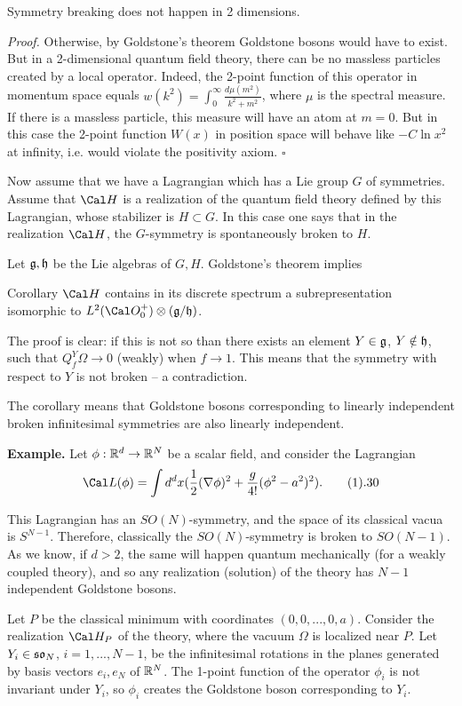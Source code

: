 Symmetry breaking does not happen in 2 dimensions. 
\endproclaim

{\it Proof.} Otherwise, by Goldstone's theorem 
Goldstone bosons would have to exist. But in a 2-dimensional 
quantum field theory, there can be no massless particles
created by a local operator. Indeed, 
the 2-point function of this operator in momentum space 
equals $w(k^2)=\int_0^\infty\frac{d\mu(m^2)}{k^2+m^2}$, where 
$\mu$ is the spectral measure. If there is a massless particle, 
this measure will have an atom at $m=0$. But in this case
the 2-point function $W(x)$ in position space will behave 
like $-C\ln x^2$ at infinity, i.e. would
violate the positivity axiom. $\square$

Now assume that we have a Lagrangian which has a Lie group $G$ 
of symmetries. Assume that $\Cal H$ is a 
realization of the quantum field theory defined 
by this Lagrangian, whose stabilizer is $H\subset G$. In this case 
one says that in the realization $\Cal H$, the $G$-symmetry is spontaneously 
broken to $H$. 

Let $\frak g,\frak h$ be the Lie algebras of $G,H$. 
Goldstone's theorem implies

\proclaim
{Corollary} $\Cal H$ contains in its discrete spectrum a subrepresentation 
isomorphic to $L^2(\O_0^+)\o (\g/\frak h)$. 
\endproclaim

 The proof is clear: if 
this is not so than there exists an element $Y\in\frak g$, $Y\notin \frak h$, such that
$Q^Y_f\Omega\to 0$ (weakly) when $f\to 1$. This means that the symmetry with respect to $Y$ is not broken -- a contradiction.
\enddemo 

The corollary means that Goldstone bosons corresponding to linearly
independent broken infinitesimal symmetries are also linearly independent.   

{\bf Example.} Let $\phi: \Bbb R^d\to \Bbb R^N$ be a scalar field, and consider
the Lagrangian
$$
\Cal L(\phi)=\int d^dx(\frac{1}{2}(\nabla\phi)^2+\frac{g}{4!}(\phi^2-a^2)^2).
\tag 1.30
$$

This Lagrangian has an $SO(N)$-symmetry, and  
the space of its classical vacua is $S^{N-1}$.
Therefore, classically the $SO(N)$-symmetry is broken to
$SO(N-1)$. As we know, if $d>2$, the same will happen 
quantum mechanically (for a weakly coupled theory), 
and so any realization (solution) of the theory has 
$N-1$ independent Goldstone bosons. 

Let $P$ be the classical minimum with coordinates $(0,0,...,0,a)$.  
Consider the realization $\Cal H_P$ of the theory, where 
the vacuum $\Omega$ is localized near $P$.
Let $Y_i\in \frak{so}_N$, $i=1,...,N-1$, be 
the infinitesimal rotations in the planes 
generated by basis vectors $e_i,e_N$ of $\Bbb R^N$.  
The 1-point function of the operator $\phi_i$ is not invariant under 
$Y_i$, so $\phi_i$ creates the Goldstone boson corresponding to $Y_i$. 

